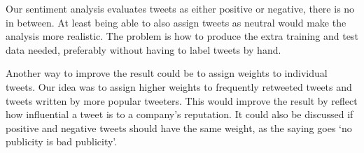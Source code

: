\documentclass[a4paper]{article}
\begin{document}
Our sentiment analysis evaluates tweets as either positive or negative, there is no in between. At least being able to also assign tweets as neutral would make the analysis more realistic. The problem is how to produce the extra training and test data needed, preferably without having to label tweets by hand.

Another way to improve the result could be to assign weights to individual tweets. Our idea was to assign higher weights to frequently retweeted tweets and tweets written by more popular tweeters. This would improve the result by reflect how influential a tweet is to a company's reputation. It could also be discussed if positive and negative tweets should have the same weight, as the saying goes ‘no publicity is bad publicity’.



\end{document}
